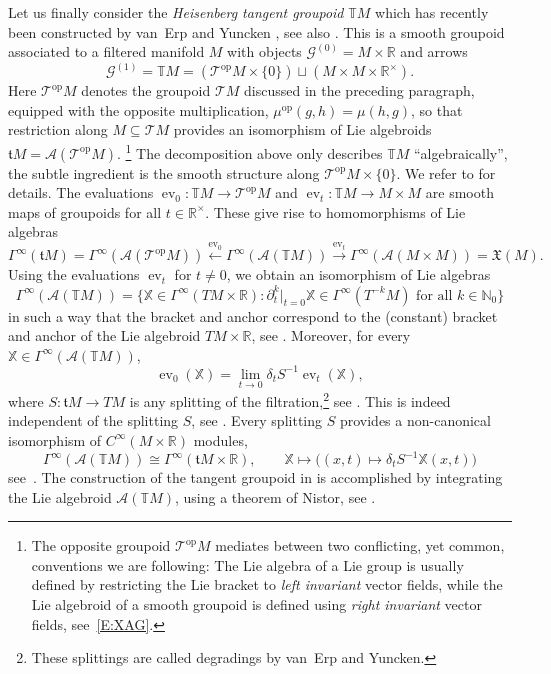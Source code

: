 \documentclass[reqno,12pt]{amsart}
\DeclareMathOperator{\ev}{ev}
\newcommand\N{\mathbb N}
\newcommand\R{\mathbb R}
\newcommand\op{\textrm{op}}
\theoremstyle{plain}
\theoremstyle{definition}
\begin{document}
Let us finally consider the \emph{Heisenberg tangent groupoid} $\mathbb TM$ which has recently been constructed by van~Erp and Yuncken \cite{EY15,EY16}, see also \cite{CP15}.
This is a smooth groupoid associated to a filtered manifold $M$ with objects $\mathcal G^{(0)}=M\times\R$ and arrows
$$
\mathcal G^{(1)}=\mathbb TM=(\mathcal T^\op M\times\{0\})\sqcup(M\times M\times\R^\times).
$$
Here $\mathcal T^\op M$ denotes the groupoid $\mathcal TM$ discussed in the preceding paragraph, equipped with the opposite multiplication, $\mu^\op(g,h)=\mu(h,g)$, so that restriction along $M\subseteq\mathcal TM$ provides an isomorphism of Lie algebroids $\mathfrak tM=\mathcal A(\mathcal T^\op M)$.
\footnote{The opposite groupoid $\mathcal T^\op M$ mediates between two conflicting, yet common, conventions we are following: The Lie algebra of a Lie group is usually defined by restricting the Lie bracket to \emph{left invariant} vector fields, while the Lie algebroid of a smooth groupoid is defined using \emph{right invariant} vector fields, see~\eqref{E:XAG}.}
The decomposition above only describes $\mathbb TM$ ``algebraically'', the subtle ingredient is the smooth structure along $\mathcal T^\op M\times\{0\}$.
We refer to \cite{EY15,EY16} for details.  
The evaluations $\ev_0\colon\mathbb TM\to\mathcal T^\op M$ and $\ev_t\colon\mathbb TM\to M\times M$ are smooth maps of groupoids for all $t\in\R^\times$.
These give rise to homomorphisms of Lie algebras
$$
\Gamma^\infty(\mathfrak tM)
=\Gamma^\infty(\mathcal A(\mathcal T^\op M))\xleftarrow{\ev_0}
\Gamma^\infty(\mathcal A(\mathbb TM))\xrightarrow{\ev_t}
\Gamma^\infty(\mathcal A(M\times M))=\mathfrak X(M).
$$
Using the evaluations $\ev_t$ for $t\neq0$, we obtain an isomorphism of Lie algebras
\begin{equation}\label{E:ATTM}
\Gamma^\infty(\mathcal A(\mathbb TM))
=\bigl\{\mathbb X\in\Gamma^\infty(TM\times\R):\textrm{$\partial_t^k|_{t=0}\mathbb X\in\Gamma^\infty(T^{-k}M)$ for all $k\in\N_0$}\bigr\}
\end{equation}
in such a way that the bracket and anchor correspond to the (constant) bracket and anchor of the Lie algebroid $TM\times\R$, see \cite[Section~3.5]{EY15}.
Moreover, for every $\mathbb X\in\Gamma^\infty(\mathcal A(\mathbb TM))$,
\begin{equation}\label{E:ev0}
\ev_0(\mathbb X)=\lim_{t\to0}\delta_tS^{-1}\ev_t(\mathbb X),
\end{equation}
where $S\colon\mathfrak tM\to TM$ is any splitting of the filtration,\footnote{These splittings are called degradings by van~Erp and Yuncken.}
see \cite[Section~3.5]{EY15}.
This is indeed independent of the splitting $S$, see \cite[Lemma~32]{EY15}.
Every splitting $S$ provides a non-canonical isomorphism of $C^\infty(M\times\R)$ modules, 
$$
\Gamma^\infty(\mathcal A(\mathbb TM))\cong\Gamma^\infty(\mathfrak tM\times\R),
\qquad\mathbb X\mapsto\bigl((x,t)\mapsto\delta_tS^{-1}\mathbb X(x,t)\bigr)
$$
see~\cite[Lemma~30]{EY15}.
The construction of the tangent groupoid in \cite{EY15,EY16} is accomplished by integrating the Lie algebroid $\mathcal A(\mathbb TM)$, using a theorem of Nistor, see \cite{N00}.
\end{document}
